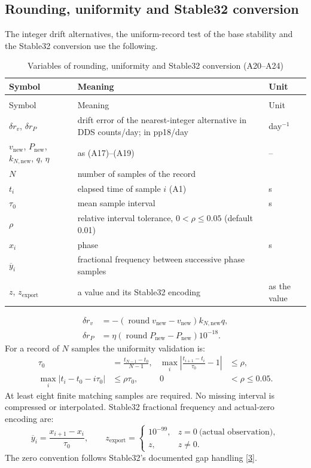 \documentclass[11pt,a4paper]{article}
\makeatletter
\newcommand{\stablemanual}{\href{http://www.stable32.com/Manual154.pdf}{[3]}}
\renewcommand{\_}{\usscore\allowbreak}
\newenvironment{vartable}[2]{%
 \par\small\setlength{\LTpre}{3pt}\setlength{\LTpost}{3pt}%
 \begin{longtable}{@{}>{\raggedright}p{.2\linewidth}>{\raggedright}p{.57\linewidth}>{\raggedright\arraybackslash}p{.17\linewidth}@{}}
 \caption{#2}\label{#1}\\
 \toprule Symbol & Meaning & Unit\\\midrule
 \endfirsthead
 \multicolumn{3}{@{}l}{\footnotesize\itshape Table \thetable{} (continued)}\\
 \toprule Symbol & Meaning & Unit\\\midrule
 \endhead
 \bottomrule
 \endlastfoot}
 {\end{longtable}\normalsize}
\makeatother
\begin{document}
\subsection{Rounding, uniformity and Stable32 conversion}
The integer drift alternatives, the uniform-record test of the base stability and the Stable32
conversion use the following.
\begin{vartable}{tab:var-A4}{Variables of rounding, uniformity and Stable32 conversion (A20--A24)}
\(\delta r_v\), \(\delta r_P\) & drift error of the nearest-integer alternative in DDS counts/day; in pp18/day & day\(^{-1}\)\\
\(v_{\mathrm{new}}\), \(P_{\mathrm{new}}\), \(k_{N,\mathrm{new}}\), \(q\), \(\eta\) & as (A17)--(A19) & --\\
\(N\) & number of samples of the record & 1\\
\(t_i\) & elapsed time of sample \(i\) (A1) & s\\
\(\tau_0\) & mean sample interval & s\\
\(\rho\) & relative interval tolerance, \(0<\rho\le0.05\) (default 0.01) & 1\\
\(x_i\) & phase & s\\
\(\overline y_i\) & fractional frequency between successive phase samples & 1\\
\(z\), \(z_{\mathrm{export}}\) & a value and its Stable32 encoding & as the value\\
\end{vartable}
\begin{align}
\delta r_v&=-(\operatorname{round}v_{\mathrm{new}}-v_{\mathrm{new}})
               k_{N,\mathrm{new}}q, \tag{A20}\label{eq:A20}\\
\delta r_P&=\eta(\operatorname{round}P_{\mathrm{new}}-P_{\mathrm{new}})10^{-18}.
 \tag{A21}\label{eq:A21}
\end{align}
For a record of \(N\) samples the uniformity validation is:
\begin{align}
\tau_0&=\frac{t_{N-1}-t_0}{N-1},&
\max_i\left|\frac{t_{i+1}-t_i}{\tau_0}-1\right|&\le\rho, \tag{A22}\label{eq:A22}\\
\max_i|t_i-t_0-i\tau_0|&\le\rho\tau_0,&
0&<\rho\le0.05. \tag{A23}\label{eq:A23}
\end{align}
At least eight finite matching samples are required. No missing interval is
compressed or interpolated. Stable32 fractional frequency and actual-zero
encoding are:
\begin{equation}
\overline y_i=\frac{x_{i+1}-x_i}{\tau_0},\qquad
z_{\mathrm{export}}=
\begin{cases}10^{-99},&z=0\ \text{(actual observation)},\\z,&z\ne0.\end{cases}
\tag{A24}\label{eq:A24}
\end{equation}
The zero convention follows Stable32's documented gap handling \stablemanual.
\end{document}
